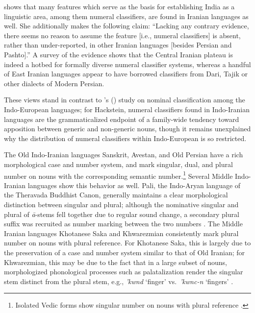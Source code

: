\documentclass[11pt]{article}
\def\citeapos#1{\citeauthor{#1}'s (\citeyear{#1})}
\begin{document}
\citet[147--148]{Heston1980} shows that many features which serve as the basis for establishing India as a linguistic area, among them numeral classifiers, are found in Iranian languages as well. She additionally makes the following claim: ``Lacking any contrary evidence, there seems no reason to assume the feature [i.e., numeral classifiers] is absent, rather than under-reported, in other Iranian languages [besides Persian and Pashto].''
A survey of the evidence shows that the Central Iranian plateau is indeed a hotbed for formally diverse numeral classifier systems, whereas a handful of East Iranian languages appear to have borrowed classifiers from Dari, Tajik or other dialects of Modern Persian.

These views stand in contrast to \citeapos{Hackstein2010} study on nominal classification among the Indo-European languages; for Hackstein, numeral classifiers found in Indo-Iranian languages are the grammaticalized endpoint of a family-wide tendency toward apposition between generic and non-generic nouns, though it remains unexplained why the distribution of numeral classifiers within Indo-European is so restricted.

The Old Indo-Iranian languages Sanskrit, Avestan, and Old Persian have a rich morphological case and number system, and mark singular, dual, and plural number on nouns with the corresponding semantic number.\footnote{Isolated Vedic forms show singular number on nouns with plural reference \citep{Oldenberg1909}.} 
Several Middle Indo-Iranian languages show this behavior as well. Pali, the Indo-Aryan language of the Theravada Buddhist Canon, generally maintains a clear morphological distinction between singular and plural; although the nominative singular and plural of {\it \=a}-stems fell together due to regular sound change, a secondary plural suffix was recruited as number marking between the two numbers \citep[150--1]{Oberlies2001}.
The Middle Iranian languages Khotanese Saka and Khwarezmian consistently mark plural number on nouns with plural reference.
For Khotanese Saka, this is largely due to the preservation of a case and number system similar to that of Old Iranian;
for Khwarezmian, this may be due to the fact that in a large subset of nouns, morphologized phonological processes such as palatalization render the singular stem distinct from the plural stem, e.g., {\it 'kwnd} `finger' vs.\ {\it 'kwnc-n} `fingers' \citep{DurkinMeisterernst2009}.
\end{document}
